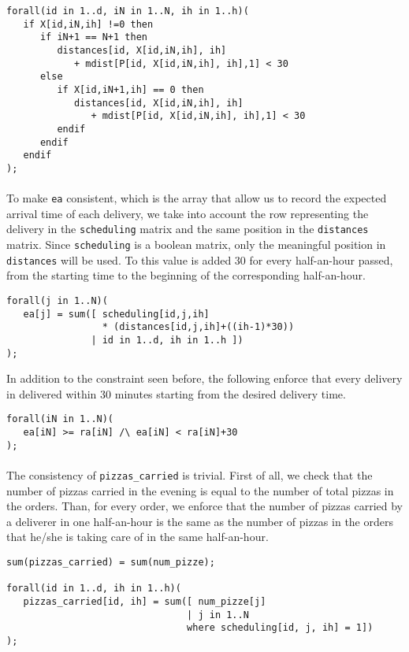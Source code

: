 \documentclass[10pt]{article}
\begin{document}
\begin{verbatim}
forall(id in 1..d, iN in 1..N, ih in 1..h)(
   if X[id,iN,ih] !=0 then
      if iN+1 == N+1 then
         distances[id, X[id,iN,ih], ih] 
            + mdist[P[id, X[id,iN,ih], ih],1] < 30
      else
         if X[id,iN+1,ih] == 0 then
            distances[id, X[id,iN,ih], ih] 
               + mdist[P[id, X[id,iN,ih], ih],1] < 30
         endif
      endif
   endif
);
\end{verbatim}

	\paragraph*{}
	To make \texttt{ea} consistent, which is the array that allow us to record the expected arrival
	time of each delivery, we take into account the row representing the delivery in the 
	\texttt{scheduling} matrix and the same position in the \texttt{distances} matrix. Since 
	\texttt{scheduling} is a boolean matrix, only the meaningful position in 
	\texttt{distances} will be used. To this value is added 30 for every half-an-hour passed,
	from the starting time to the beginning of the corresponding half-an-hour. 
	\begin{verbatim}
forall(j in 1..N)(
   ea[j] = sum([ scheduling[id,j,ih] 
                 * (distances[id,j,ih]+((ih-1)*30))
               | id in 1..d, ih in 1..h ])  
);
	\end{verbatim}

	In addition to the constraint seen before, the following enforce that every delivery
	in delivered within 30 minutes starting from the desired delivery time.
	\begin{verbatim}
forall(iN in 1..N)(
   ea[iN] >= ra[iN] /\ ea[iN] < ra[iN]+30 
);		  
	\end{verbatim}

	\paragraph*{}
	The consistency of \texttt{pizzas\_carried} is trivial. First of all, we check that
	the number of pizzas carried in the evening is equal to the number of total pizzas in the 
	orders. Than, for every order, we enforce that the number of pizzas carried by a deliverer 
	in one half-an-hour is the same as the number of pizzas in the orders that he/she 
	is taking care of in the same half-an-hour.
	\begin{verbatim}
sum(pizzas_carried) = sum(num_pizze);

forall(id in 1..d, ih in 1..h)(
   pizzas_carried[id, ih] = sum([ num_pizze[j]
                                | j in 1..N 
                                where scheduling[id, j, ih] = 1])
);
	\end{verbatim}
\end{document}
